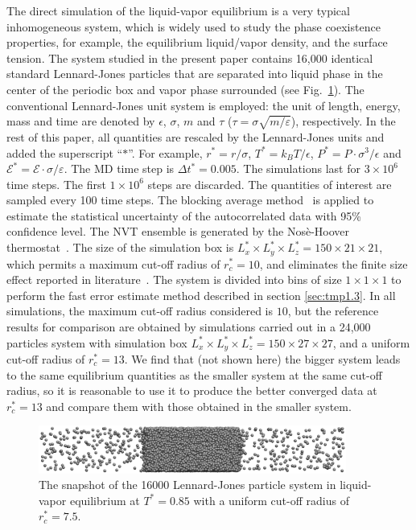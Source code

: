\documentclass[aps, pre, preprint]{revtex4}
\begin{document}
The direct simulation of the liquid-vapor equilibrium is a very
typical inhomogeneous system, which is widely used to study the phase
coexistence properties, for example, the equilibrium liquid/vapor
density, and the surface tension. The system studied in the present
paper contains 16,000 identical standard Lennard-Jones particles that are
separated into liquid phase in the center of the periodic box and vapor phase
surrounded (see Fig.~\ref{fig:tmp1}).  The conventional Lennard-Jones
unit system is employed: the unit of length, energy, mass and time are
denoted by $\epsilon$, $\sigma$, $m$ and $\tau$ ($\tau =
\sigma\sqrt{m/\varepsilon}$), respectively.  In the rest of this paper,
all quantities are
rescaled by the Lennard-Jones units and added the superscript ``$\ast$''.
For example, $r^\ast = r / \sigma$, $T^\ast = k_BT / \epsilon$,
$P^\ast = P\cdot \sigma^3 / \epsilon$ and $\mathcal E^\ast = \mathcal
E\cdot\sigma/\varepsilon$.  The MD time step {is} $\Delta t^\ast =
0.005$. The simulations last for $3\times 10^6$ time steps. The first
$1\times 10^6$ steps are discarded. The quantities of interest are
sampled every 100 time steps. The blocking average
method~\cite{flyvbjerg1989error} is applied to estimate the
statistical uncertainty of the autocorrelated data with 95\%
confidence level. The NVT ensemble is generated by the Nos\`e-Hoover
thermostat~\cite{nose1984molecular, hoover1985canonical}.  The size of
the simulation box is $L_x^\ast \times L_y^\ast \times L_z^\ast =
150\times 21\times 21$, which permits a maximum cut-off radius of
$r_c^\ast = 10$, and eliminates the finite size effect reported in
literature~\cite{chen1995area, orea2005oscillatory,
  biscay2009calculation}.
The system is divided into bins of size $1\times1\times1$ to perform the fast error
estimate method described in section \ref{sec:tmp1.3}.
In all simulations, the maximum cut-off
radius considered is $10$, but the reference results for comparison
are obtained by simulations carried out in a 24,000 particles system
with simulation box $L_x^\ast \times L_y^\ast \times L_z^\ast =
150\times 27\times 27$, and a uniform cut-off radius of $r_c^\ast =
13$.  {We find that (not shown here)
  the bigger system leads to the same equilibrium
  quantities as the smaller system at the same cut-off radius, so
  it is reasonable to
  use it to produce the better converged data at $r_c^\ast=13$ and compare them with
  those obtained in the smaller system.
}

\begin{figure}
  \centering
  \includegraphics[width=0.9\textwidth]{confout.eps}
  \caption{The snapshot of the 16000 Lennard-Jones particle system in
    liquid-vapor equilibrium at $T^\ast=0.85$ with a uniform cut-off
    radius of $r_c^\ast = 7.5$.}
  \label{fig:tmp1}
\end{figure}
\end{document}
